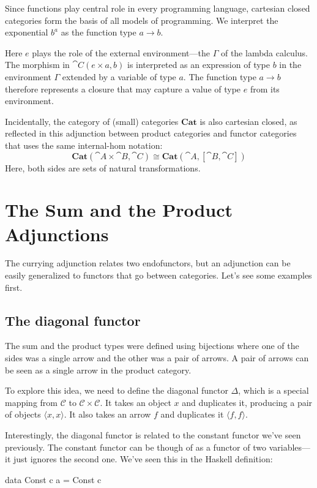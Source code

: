 \documentclass[DaoFP]{subfiles}
\begin{document}
Since functions play central role in every programming language, cartesian closed categories form the basis of all models of programming. We interpret the exponential $b^a$ as the function type $a \to b$. 

Here $e$ plays the role of the external environment---the $\Gamma$ of the lambda calculus. The morphism in $\cat C(e \times a, b)$ is interpreted as an expression of type $b$ in the environment $\Gamma$ extended by a variable of type $a$. The function type $a \to b$ therefore represents a closure that may capture a value of type $e$ from its environment.

Incidentally, the category of (small) categories $\mathbf{Cat}$ is also cartesian closed, as reflected in this adjunction between product categories and functor categories that uses the same internal-hom notation:
\[ \mathbf{Cat} (\cat A \times \cat B, \cat C) \cong \mathbf{Cat} (\cat A, [\cat B, \cat C]) \]
Here, both sides are sets of natural transformations.


\section{The Sum and the Product Adjunctions}

The currying adjunction relates two endofunctors, but an adjunction can be easily generalized to functors that go between categories. Let's see some examples first.

\subsection{The diagonal functor}

The sum and the product types were defined using bijections where one of the sides was a single arrow and the other was a pair of arrows. A pair of arrows can be seen as a single arrow in the product category. 

To explore this idea, we need to define the diagonal functor $\Delta$, which is a special mapping from $\mathcal{C}$ to $\mathcal{C} \times \mathcal{C}$. It takes an object $x$ and duplicates it, producing a pair of objects $\langle x, x \rangle$. It also takes an arrow $f$ and duplicates it $\langle f, f \rangle$.

Interestingly, the diagonal functor is related to the constant functor we've seen previously. The constant functor can be though of as a functor of two variables---it just ignores the second one. We've seen this in the Haskell definition:
\begin{haskell}
data Const c a = Const c
\end{haskell}
\end{document}
